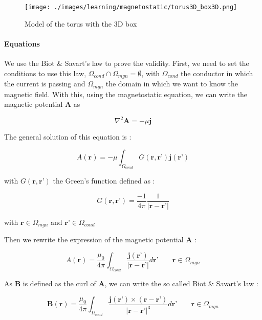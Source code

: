 \documentclass[11pt]{amsart}
\begin{document}
\begin{figure}[h]{}
\centering\texttt{[image: ./images/learning/magnetostatic/torus3D\_box3D.png]}
\caption{Model of the torus with the 3D box}
\centering
\end{figure}

\hypertarget{x-equations}{\paragraph{Equations}}
We use the Biot & Savart’s law to prove the validity.
First, we need to set the conditions to use this law, $\Omega_{cond}\cap\Omega_{mgn}=\emptyset$,
with $\Omega_{cond}$ the conductor in which the current is passing and
$\Omega_{mgn}$ the domain in which we want to know the magnetic field.
With this, using the magnetostatic equation, we can write the magnetic potential \textbf{A} as



\[
\nabla^{2}\textbf{A}=-\mu\textbf{j}
\]



The general solution of this equation is :



\[
A(\textbf{r})=-\mu\int_{\Omega_{cond}}G(\textbf{r},\textbf{r'})\textbf{j}(\textbf{r'})
\]



with $G(\textbf{r},\textbf{r'})$ the Green’s function defined as :



\[
G(\textbf{r},\textbf{r'})=\frac{-1}{4\pi}\frac{1}{|\textbf{r}-\textbf{r'}|}
\]



with $\textbf{r}\in\Omega_{mgn}$ and $\textbf{r'}\in\Omega_{cond}$


Then we rewrite the expression of the magnetic potential \textbf{A} :



\[
A(\textbf{r})=\frac{\mu_{0}}{4\pi}\int_{\Omega_{cond}}\frac{\textbf{j}(\textbf{r'})}{|\textbf{r}-\textbf{r'}|} d\textbf{r'}\;\;\;\;\;\;\;\textbf{r}\in\Omega_{mgn}
\]



As \textbf{B} is defined as the curl of \textbf{A}, we can write the so called Biot & Savart’s law :



\[
\textbf{B}(\textbf{r})=\frac{\mu_{0}}{4\pi}\int_{\Omega_{cond}}\frac{\textbf{j}(\textbf{r'})\times(\textbf{r}-\textbf{r'})}{|\textbf{r}-\textbf{r'}|^{3}} d\textbf{r'}\;\;\;\;\;\;\;\textbf{r}\in\Omega_{mgn}
\]
\end{document}
